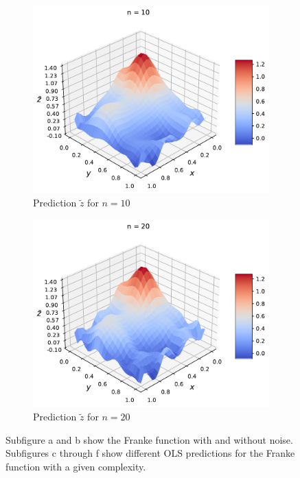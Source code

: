 \documentclass[norsk,a4paper,12pt]{scrartcl}
\begin{document}
\begin{figure}[H]
\begin{subfigure}[b]{0.49\textwidth}
     \end{subfigure}
      \begin{subfigure}[b]{0.49\textwidth}
         \centering
         \includegraphics[width=\textwidth]{figures/zprediction/n10.pdf}
         \caption{Prediction $\tilde{z}$ for $n=10$}
         \label{fig:z_n10}
     \end{subfigure}
     \hfill
     \begin{subfigure}[b]{0.49\textwidth}
         \centering
         \includegraphics[width=\textwidth]{figures/zprediction/n20.pdf}
         \caption{Prediction $\tilde{z}$ for $n=20$}
         \label{fig:z_n20}
     \end{subfigure}
    \caption{Subfigure a and b show the Franke function with and without noise. Subfigures c through f show different OLS predictions for the Franke function with a given complexity.}
    \label{fig:z_multi}
\end{figure}
\end{document}
